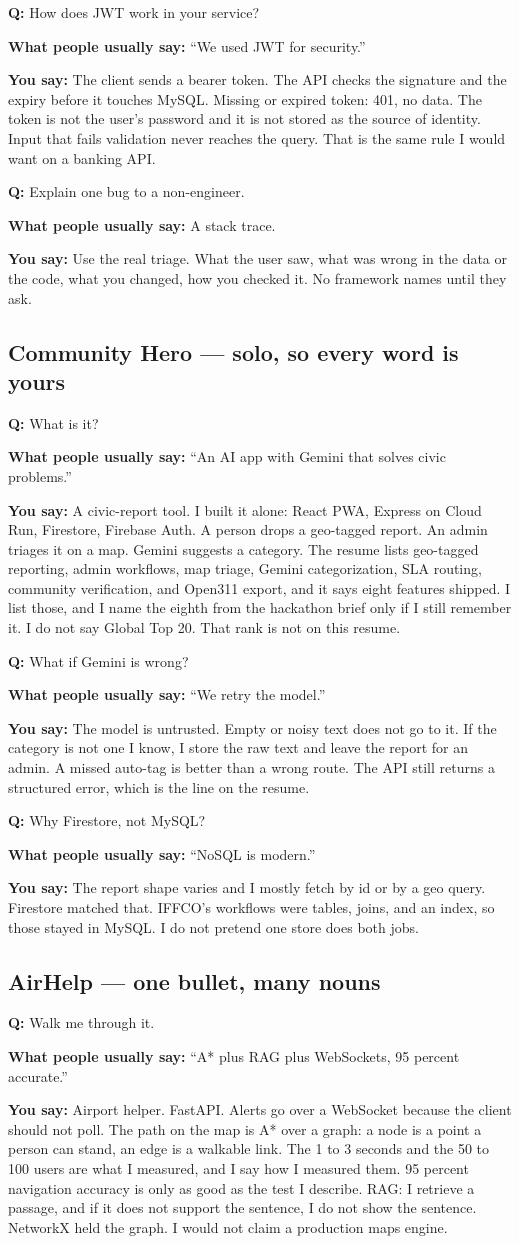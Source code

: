 \documentclass[a4paper,9.5pt]{extarticle}
\newcommand{\Q}[1]{\par\vspace{1.5pt}\noindent\textcolor{hot}{\textbf{Q:} #1}\par}
\newcommand{\Typ}[1]{\noindent\textcolor{muted}{\textbf{What people usually say:} #1}\par}
\newcommand{\Say}[1]{\noindent\textcolor{ok}{\textbf{You say:} #1}\par}
\begin{document}
\Q{How does JWT work in your service?}
\Typ{``We used JWT for security.''}
\Say{The client sends a bearer token. The API checks the signature and the expiry before it touches MySQL. Missing or expired token: 401, no data. The token is not the user's password and it is not stored as the source of identity. Input that fails validation never reaches the query. That is the same rule I would want on a banking API.}

\Q{Explain one bug to a non-engineer.}
\Typ{A stack trace.}
\Say{Use the real triage. What the user saw, what was wrong in the data or the code, what you changed, how you checked it. No framework names until they ask.}

\subsection{Community Hero --- solo, so every word is yours}
\Q{What is it?}
\Typ{``An AI app with Gemini that solves civic problems.''}
\Say{A civic-report tool. I built it alone: React PWA, Express on Cloud Run, Firestore, Firebase Auth. A person drops a geo-tagged report. An admin triages it on a map. Gemini suggests a category. The resume lists geo-tagged reporting, admin workflows, map triage, Gemini categorization, SLA routing, community verification, and Open311 export, and it says eight features shipped. I list those, and I name the eighth from the hackathon brief only if I still remember it. I do not say Global Top 20. That rank is not on this resume.}

\Q{What if Gemini is wrong?}
\Typ{``We retry the model.''}
\Say{The model is untrusted. Empty or noisy text does not go to it. If the category is not one I know, I store the raw text and leave the report for an admin. A missed auto-tag is better than a wrong route. The API still returns a structured error, which is the line on the resume.}

\Q{Why Firestore, not MySQL?}
\Typ{``NoSQL is modern.''}
\Say{The report shape varies and I mostly fetch by id or by a geo query. Firestore matched that. IFFCO's workflows were tables, joins, and an index, so those stayed in MySQL. I do not pretend one store does both jobs.}

\subsection{AirHelp --- one bullet, many nouns}
\Q{Walk me through it.}
\Typ{``A* plus RAG plus WebSockets, 95 percent accurate.''}
\Say{Airport helper. FastAPI. Alerts go over a WebSocket because the client should not poll. The path on the map is A* over a graph: a node is a point a person can stand, an edge is a walkable link. The 1 to 3 seconds and the 50 to 100 users are what I measured, and I say how I measured them. 95 percent navigation accuracy is only as good as the test I describe. RAG: I retrieve a passage, and if it does not support the sentence, I do not show the sentence. NetworkX held the graph. I would not claim a production maps engine.}
\end{document}
